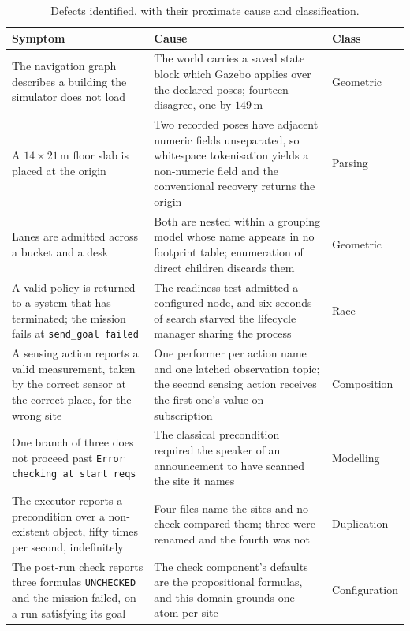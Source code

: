 \documentclass[11pt,a4paper]{article}
\theoremstyle{definition}
\newcommand{\code}[1]{\texttt{\small #1}}
\begin{document}
\begin{table}[H]
\centering\small
\caption{Defects identified, with their proximate cause and classification.}
\label{tab:defects}
\begin{tabularx}{\textwidth}{@{}p{}Xl@{}}
\toprule
\textbf{Symptom} & \textbf{Cause} & \textbf{Class} \\
\midrule
The navigation graph describes a building the simulator does not load &
The world carries a saved state block which Gazebo applies over the declared
poses; fourteen disagree, one by $149$\,m &
Geometric \\
\addlinespace
A $14 \times 21$\,m floor slab is placed at the origin &
Two recorded poses have adjacent numeric fields unseparated, so whitespace
tokenisation yields a non-numeric field and the conventional recovery returns
the origin &
Parsing \\
\addlinespace
Lanes are admitted across a bucket and a desk &
Both are nested within a grouping model whose name appears in no footprint
table; enumeration of direct children discards them &
Geometric \\
\addlinespace
A valid policy is returned to a system that has terminated; the mission fails
at \code{send\_goal failed} &
The readiness test admitted a configured node, and six seconds of search
starved the lifecycle manager sharing the process &
Race \\
\addlinespace
A sensing action reports a valid measurement, taken by the correct sensor at
the correct place, for the wrong site &
One performer per action name and one latched observation topic; the second
sensing action receives the first one's value on subscription &
Composition \\
\addlinespace
One branch of three does not proceed past
\code{Error checking at start reqs} &
The classical precondition required the speaker of an announcement to have
scanned the site it names &
Modelling \\
\addlinespace
The executor reports a precondition over a non-existent object, fifty times per
second, indefinitely &
Four files name the sites and no check compared them; three were renamed and
the fourth was not &
Duplication \\
\addlinespace
The post-run check reports three formulas \code{UNCHECKED} and the mission
failed, on a run satisfying its goal &
The check component's defaults are the propositional formulas, and this domain
grounds one atom per site &
Configuration \\
\bottomrule
\end{tabularx}
\end{table}
\end{document}
